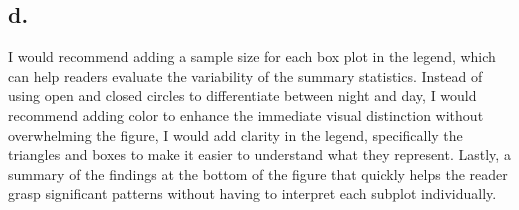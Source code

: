 \documentclass[
  letterpaper,
  DIV=11,
  numbers=noendperiod]{scrartcl}
\begin{document}
\subsection{d.}\label{d.-2}

I would recommend adding a sample size for each box plot in the legend,
which can help readers evaluate the variability of the summary
statistics. Instead of using open and closed circles to differentiate
between night and day, I would recommend adding color to enhance the
immediate visual distinction without overwhelming the figure, I would
add clarity in the legend, specifically the triangles and boxes to make
it easier to understand what they represent. Lastly, a summary of the
findings at the bottom of the figure that quickly helps the reader grasp
significant patterns without having to interpret each subplot
individually.
\end{document}
